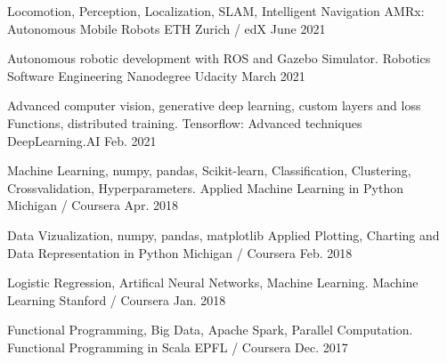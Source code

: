 

\begin{cventries}

    \course
    {Locomotion, Perception, Localization, SLAM, Intelligent Navigation} %
    {AMRx: Autonomous Mobile Robots} %
    {ETH Zurich / edX} %
    {June 2021} %
    {}

    \course
    {Autonomous robotic development with ROS and Gazebo Simulator.} %
    {Robotics Software Engineering Nanodegree} %
    {Udacity} %
    {March 2021} %
    {}

    \course
    {Advanced computer vision, generative deep learning, custom layers and loss Functions, distributed training.} %
    {Tensorflow: Advanced techniques} %
    {DeepLearning.AI} %
    {Feb. 2021} %
    {}

    \course
    {Machine Learning, numpy, pandas, Scikit-learn, Classification, Clustering, Crossvalidation, Hyperparameters.} %
    {Applied Machine Learning in Python} %
    {Michigan / Coursera} %
    {Apr. 2018} %
    {}

   \course
   {Data Vizualization, numpy, pandas, matplotlib} %
   {Applied Plotting, Charting and Data Representation in Python} %
   {Michigan / Coursera} %
   {Feb. 2018} %
   {}

    \course
    {Logistic Regression, Artifical Neural Networks, Machine Learning.} %
    {Machine Learning} %
    {Stanford / Coursera} %
    {Jan. 2018} %
    {}

    \course
    {Functional Programming, Big Data, Apache Spark, Parallel Computation.} %
    {Functional Programming in Scala} %
    {EPFL / Coursera} %
    {Dec. 2017} %
    {}

\end{cventries}